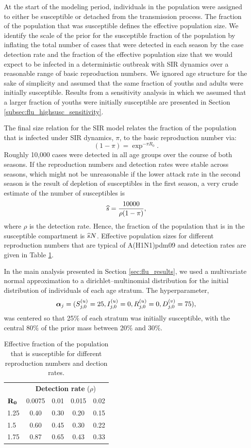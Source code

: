 At the start of the modeling period, individuals in the population were assigned to either be susceptible or detached from the transmission process. The fraction of the population that was susceptible defines the effective population size. We identify the scale of the prior for the susceptible fraction of the population by inflating the total number of cases that were detected in each season by the case detection rate and the fraction of the effective population size that we would expect to be infected in a deterministic outbreak with SIR dynamics over a reasonable range of basic reproduction numbers. We ignored age structure for the sake of simplicity and assumed that the same fraction of youths and adults were initially susceptible. Results from a sensitivity analysis in which we assumed that a larger fraction of youths were initially susceptible are presented in Section \ref{subsec:flu_highsusc_sensitivity}.

The final size relation for the SIR model \cite{miller2012note} relates the fraction of the population that is infected under SIR dynamics, $ \pi $, to the basic reproduction number via: 
$$(1-\pi) = \exp^{-\pi R_0}.$$
Roughly 10,000 cases were detected in all age groups over the course of both seasons. If the reproduction numbers and detection rates were stable across seasons, which might not be unreasonable if the lower attack rate in the second season is the result of depletion of susceptibles in the first season, a very crude estimate of the number of susceptibles is $$\widehat{s} = \frac{10000}{\rho(1-\pi)},$$
where $ \rho $ is the detection rate. Hence, the fraction of the population that is in the susceptible compartment is $ \widehat{s}N $. Effective population sizes for different reproduction numbers that are typical of A(H1N1)pdm09 \cite{biggerstaff2014estimates} and detection rates \cite{shubin2016revealing} are given in Table \ref{tab:flu_effpop_priors}. 

In the main analysis presented in Section \ref{sec:flu_results}, we used a multivariate normal approximation to a dirichlet--multinomial distribution for the initial distribution of individuals of each age stratum. The hyperparameter, $$ \boldsymbol{\alpha}_j = ({S_{j,0}^{(u)}} = 25, {I_{j,0}^{(u)}}=0,{R_{j,0}^{(u)}}=0,D_{j,0}^{(v)} = 75), $$ was centered so that 25\% of each stratum was initially susceptible, with the central 80\% of the prior mass between 20\% and 30\%. 

\begin{table}[htbp]
	\caption{Effective fraction of the population that is susceptible for different reproduction numbers and dection rates.}
	\label{tab:flu_effpop_priors}
	\centering
	\begin{tabular}{lcccc}
		& \multicolumn{4}{c}{\textbf{Detection rate} ($ \rho $)}\\
		\cmidrule{2-5}$ \mathbf{R_0} $&  0.0075 & 0.01 & 0.015 &0.02\\
		\hline
		1.25 & 0.40 & 0.30 & 0.20 & 0.15\\
		1.5 & 0.60 & 0.45 & 0.30 & 0.22\\
		1.75 & 0.87 & 0.65 & 0.43 & 0.33\\
		\hline
	\end{tabular}
\end{table}

